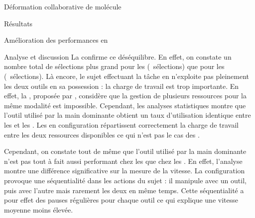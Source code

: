 \documentclass[myfrancais,ngerman,english,french]{mythesis}
\begin{document}
\begin{mychapter}{Déformation collaborative de molécule}
\begin{mysection}{Résultats}
\begin{mysubsection}{Amélioration des performances en }
\begin{mysubsubsection}{Analyse et discussion}
					La  confirme ce déséquilibre.
					En effet, on constate un nombre total de sélections plus grand pour les  (~sélections) que pour les  (~sélections).
					Là encore, le sujet effectuant la tâche en  n'exploite pas pleinement les deux outils en sa possession : la charge de travail est trop importante.
					En effet, la , proposée par , considère que la gestion de plusieurs ressources pour la même modalité est impossible.
					Cependant, les analyses statistiques montre que l'outil utilisé par la main dominante obtient un taux d'utilisation identique entre les  et les .
					Les  en configuration  répartissent correctement la charge de travail entre les deux ressources disponibles ce qui n'est pas le cas des .

					Cependant, on constate tout de même que l'outil utilisé par la main dominante n'est pas tout à fait aussi performant chez les  que chez les .
					En effet, l'analyse montre une différence significative sur la mesure de la vitesse.
					La configuration  provoque une séquentialité dans les actions du sujet : il manipule avec un outil, puis avec l'autre mais rarement les deux en même temps.
					Cette séquentialité a pour effet des pauses régulières pour chaque outil ce qui explique une vitesse moyenne moins élevée.


\end{mysubsubsection}
\end{mysubsection}
\end{mysection}
\end{mychapter}
\end{document}
